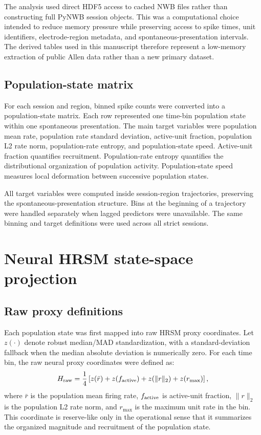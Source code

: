 \documentclass[11pt]{article}
\begin{document}
The analysis used direct HDF5 access to cached NWB files rather than constructing full PyNWB session objects. This was a computational choice intended to reduce memory pressure while preserving access to spike times, unit identifiers, electrode-region metadata, and spontaneous-presentation intervals. The derived tables used in this manuscript therefore represent a low-memory extraction of public Allen data rather than a new primary dataset.

\subsection{Population-state matrix}

For each session and region, binned spike counts were converted into a population-state matrix. Each row represented one time-bin population state within one spontaneous presentation. The main target variables were population mean rate, population rate standard deviation, active-unit fraction, population L2 rate norm, population-rate entropy, and population-state speed. Active-unit fraction quantifies recruitment. Population-rate entropy quantifies the distributional organization of population activity. Population-state speed measures local deformation between successive population states.

All target variables were computed inside session-region trajectories, preserving the spontaneous-presentation structure. Bins at the beginning of a trajectory were handled separately when lagged predictors were unavailable. The same binning and target definitions were used across all strict sessions.

\section{Neural HRSM state-space projection}

\subsection{Raw proxy definitions}

Each population state was first mapped into raw HRSM proxy coordinates. Let \(z(\cdot)\) denote robust median/MAD standardization, with a standard-deviation fallback when the median absolute deviation is numerically zero. For each time bin, the raw neural proxy coordinates were defined as:
\[
H_{\rm raw}
=
\frac{1}{4}
\left[
z(\bar r)
+
z(f_{\rm active})
+
z(\lVert r\rVert_2)
+
z(r_{\max})
\right],
\]
where \(\bar r\) is the population mean firing rate, \(f_{\rm active}\) is active-unit fraction, \(\lVert r\rVert_2\) is the population L2 rate norm, and \(r_{\max}\) is the maximum unit rate in the bin. This coordinate is reserve-like only in the operational sense that it summarizes the organized magnitude and recruitment of the population state.
\end{document}

